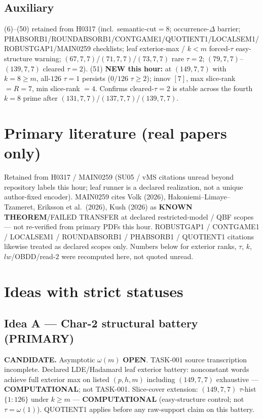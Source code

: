 \documentclass[11pt]{article}
\begin{document}
\subsection*{Auxiliary}
(6)--(50) retained from H0317 (incl.\ semantic-cut$=8$; occurrence-$\Delta$ barrier;
PHABSORB1/ROUNDABSORB1/CONTGAME1/QUOTIENT1/LOCALSEM1/ROBUSTGAP1/MAIN0259 checklists;
leaf exterior-max / $k{<}m$ forced-$\tau$ easy-structure warning;
$(67,7,7)$/$(71,7,7)$/$(73,7,7)$ rare $\tau{=}2$; $(79,7,7)$--$(139,7,7)$ cleared $\tau{=}2$).
(51) \textbf{NEW this hour:} at $(149,7,7)$ with $k{=}8{\ge}m$, all-$126$ $\tau{=}1$ persists
($0/126$ $\tau{\ge}2$); innov $[7]$, max slice-rank $=R{=}7$, min slice-rank $=4$.
Confirms cleared-$\tau{=}2$ is stable across the fourth $k{=}8$ prime after $(131,7,7)$/$(137,7,7)$/$(139,7,7)$.

\section*{Primary literature (real papers only)}
Retained from H0317 / MAIN0259 (SU05 / vMS citations unread beyond repository labels this hour;
leaf runner is a declared realization, not a unique author-fixed encoder).
MAIN0259 cites Volk (2026), Hakoniemi--Limaye--Tzameret, Eriksson et al.\ (2026), Kush (2026)
as \textbf{KNOWN THEOREM}/FAILED TRANSFER at declared restricted-model / QBF scopes ---
not re-verified from primary PDFs this hour.
ROBUSTGAP1 / CONTGAME1 / LOCALSEM1 / ROUNDABSORB1 / PHABSORB1 / QUOTIENT1 citations likewise
treated as declared scopes only.
Numbers below for exterior ranks, $\tau$, $k$, $lw$/OBDD/read-$2$
were recomputed here, not quoted unread.

\section*{Ideas with strict statuses}
\subsection*{Idea A --- Char-2 structural battery (PRIMARY)}
\textbf{CANDIDATE.} Asymptotic $\omega(m)$ \textbf{OPEN}. TASK-001 source transcription incomplete.
Declared LDE/Hadamard leaf exterior battery: nonconstant words achieve full exterior max on
listed $(p,h,m)$ including $(149,7,7)$ exhaustive --- \textbf{COMPUTATIONAL}; not TASK-001.
Slice-cover extension: $(149,7,7)$ $\tau$-hist $\{1{:}126\}$ under $k{\ge}m$ ---
\textbf{COMPUTATIONAL} (easy-structure control; not $\tau=\omega(1)$).
QUOTIENT1 applies before any raw-support claim on this battery.
\end{document}

